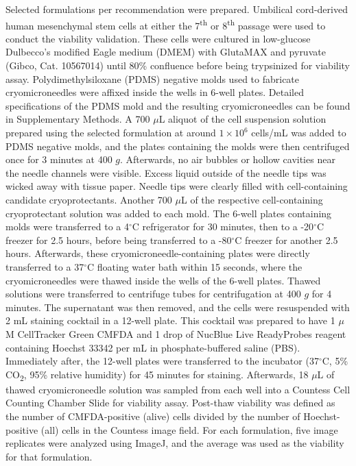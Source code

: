 \documentclass[11pt]{article}
\begin{document}
Selected formulations per recommendation were prepared. Umbilical cord-derived human mesenchymal stem cells at either the 7\textsuperscript{th} or 8\textsuperscript{th} passage were used to conduct the viability validation. These cells were cultured in low-glucose Dulbecco's modified Eagle medium (DMEM) with GlutaMAX and pyruvate (Gibco, Cat. 10567014) until 80\% confluence before being trypsinized for viability assay. Polydimethylsiloxane (PDMS) negative molds used to fabricate cryomicroneedles were affixed inside the wells in 6-well plates. Detailed specifications of the PDMS mold and the resulting cryomicroneedles can be found in Supplementary Methods. A 700 \ensuremath{\mu}L aliquot of the cell suspension solution prepared using the selected formulation at around $1\times{}10^{6}$ cells/mL was added to PDMS negative molds, and the plates containing the molds were then centrifuged once for 3 minutes at 400 $g$. Afterwards, no air bubbles or hollow cavities near the needle channels were visible. Excess liquid outside of the needle tips was wicked away with tissue paper. Needle tips were clearly filled with cell-containing candidate cryoprotectants. Another 700 \ensuremath{\mu}L of the respective cell-containing cryoprotectant solution was added to each mold. The 6-well plates containing molds were transferred to a 4$^\circ$C refrigerator for 30 minutes, then to a -20$^\circ$C freezer for 2.5 hours, before being transferred to a -80$^\circ$C freezer for another 2.5 hours. Afterwards, these cryomicroneedle-containing plates were directly transferred to a 37$^\circ$C floating water bath within 15 seconds, where the cryomicroneedles were thawed inside the wells of the 6-well plates. Thawed solutions were transferred to centrifuge tubes for centrifugation at 400 $g$ for 4 minutes. The supernatant was then removed, and the cells were resuspended with 2 mL staining cocktail in a 12-well plate. This cocktail was prepared to have 1 \ensuremath{\mu}M CellTracker Green CMFDA and 1 drop of NucBlue Live ReadyProbes reagent containing Hoechst 33342 per mL in phosphate-buffered saline (PBS). Immediately after, the 12-well plates were transferred to the incubator (37$^\circ$C, 5\% CO\textsubscript{2}, 95\% relative humidity) for 45 minutes for staining. Afterwards, 18 \ensuremath{\mu}L of thawed cryomicroneedle solution was sampled from each well into a Countess Cell Counting Chamber Slide for viability assay. Post-thaw viability was defined as the number of CMFDA-positive (alive) cells divided by the number of Hoechst-positive (all) cells in the Countess image field. For each formulation, five image replicates were analyzed using ImageJ, and the average was used as the viability for that formulation.
\end{document}
